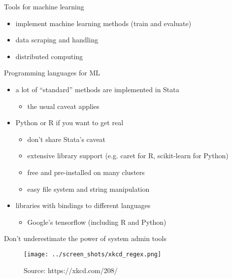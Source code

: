 \documentclass[xcolor=dvipsnames]{beamer}
\begin{document}
\begin{frame}{Tools for machine learning}
\begin{itemize}
  \item implement machine learning methods (train and evaluate)
  \item data scraping and handling 
  \item distributed computing 
\end{itemize}
\end{frame}


\begin{frame}{Programming languages for ML}
\begin{itemize}
  \item a lot of ``standard'' methods are implemented in Stata
  \begin{itemize}
    \item the usual caveat applies 
  \end{itemize}
  \item Python or R if you want to get real
  \begin{itemize}
    \item don't share Stata's caveat
    \item extensive library support (e.g. caret for R, scikit-learn for Python)
    \item free and pre-installed on many clusters
    \item easy file system and string manipulation 
  \end{itemize}
  \item libraries with bindings to different languages
  \begin{itemize}
    \item Google's tensorflow (including R and Python)
  \end{itemize}
  \end{itemize}
\end{frame}


\begin{frame}{Don't underestimate the power of system admin tools}
\begin{figure}
  \texttt{[image: ../screen\_shots/xkcd\_regex.png]}
   \caption{Source: https://xkcd.com/208/}
\end{figure}
\end{frame}
\end{document}
